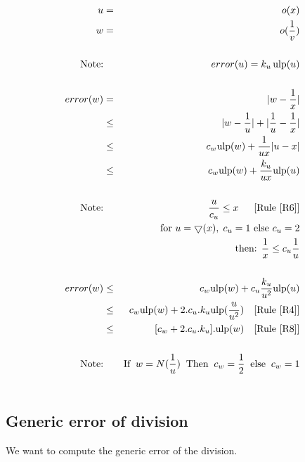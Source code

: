 \documentclass[12pt]{amsart}
\def\n{\textnormal}
\def\minf{\bigtriangledown}
\def\ulp{{\rm ulp}}
\newcommand{\U}[1]{\quad \mbox{[Rule~\ref{#1}]}}
\begin{document}
\begin{eqnarray}\nonumber
u&=&o(x) \\\nonumber
w&=&o(\frac{1}{v}) \\\nonumber
&&\\\nonumber
\textnormal{Note:}&& error(u) = k_u \, \ulp(u)\\\nonumber
&&\\\nonumber
error(w)& = &|w - \frac{1}{x}| \\\nonumber
& \leq &|w - \frac{1}{u}| +|\frac{1}{u} - \frac{1}{x}| \\\nonumber
& \leq & c_w \ulp(w) + \frac{1}{ux}|u-x| \\\nonumber
& \leq & c_w \ulp(w) + \frac{k_u}{ux} \ulp(u)\\\nonumber
&&\\\nonumber
\textnormal{Note:}&& \frac{u}{c_u} \leq x\;\; \U{R6}\\\nonumber
&&\n{for } u=\minf(x),\;c_u=1 \n{ else } c_u=2\\\nonumber
&& \n{then: } \frac{1}{x} \leq c_u \frac{1}{u} \\\nonumber
&&\\\nonumber
error(w)& \leq & c_w \ulp(w) + c_u\frac{k_u}{u^2} \ulp(u)\\\nonumber
& \leq & c_w \ulp(w) + 2.c_u.k_u \ulp(\frac{u}{u^2}) \U{R4}\\\nonumber
& \leq & [c_w + 2.c_u.k_u].\ulp(w) \U{R8}\\\nonumber
&&\\\nonumber
\textnormal{Note:}&&\textnormal{If}\;\; w=N(\frac{1}{u}) \;\;\textnormal{Then}\;\; c_w =\frac{1}{2} \;\;\textnormal{else}\;\; c_w =1\\\nonumber\end{eqnarray}

\subsection{Generic error of division}\label{generic:div}


We want to compute the generic error of the division.
\end{document}
